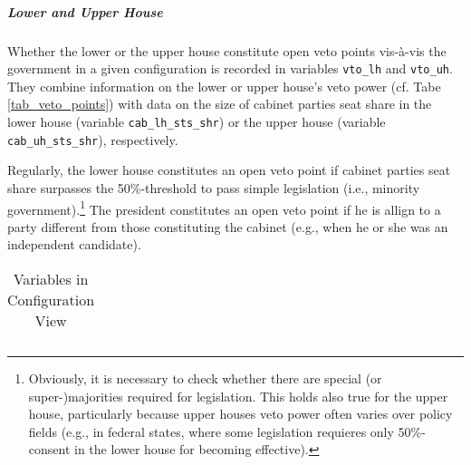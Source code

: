\subparagraph{Lower and Upper House} Whether the lower or the upper house constitute open veto points vis-\`a-vis the government in a given configuration is recorded in variables \texttt{\footnotesize vto\_lh} and \texttt{\footnotesize vto\_uh}. They combine information on the lower or upper house's veto power (cf. Tabe \ref{tab_veto_points}) with data on the size of cabinet parties seat share in the lower house (variable \texttt{\footnotesize cab\_lh\_sts\_shr}) or the upper house (variable \texttt{\footnotesize cab\_uh\_sts\_shr}), respectively. 

Regularly, the lower house constitutes an open veto point if cabinet parties seat share surpasses the 50\%-threshold to pass simple legislation (i.e., minority government).\footnote{Obviously, it is necessary to check whether there are special (or super-)majorities required for legislation. This holds also true for the upper house, particularly because upper houses veto power often varies over policy fields (e.g., in federal states, where some legislation requieres only 50\%-consent in the lower house for becoming effective).} The president constitutes an open veto point if he is allign to a party different from those constituting the cabinet (e.g., when he or she was an independent candidate).


\begin{center}
\begin{longtable}{L{4cm} L{6cm} L{3cm}}
\caption{Variables in Configuration View\label{tab_view_configuration}}


\end{longtable}
\end{center}
